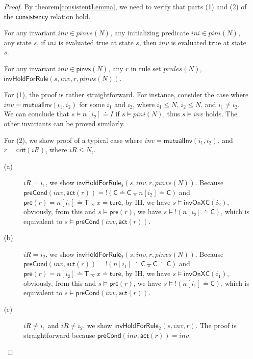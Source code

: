 \documentclass[final]{IEEEtran}
\def \eqc {\doteq }
\def \andc {\barwedge }
\def \negc {!}
\begin{document}
\begin{proof} By theorem\ref{consistentLemma}, we need
to verify that parts (1) and (2) of
 the $\mathsf{consistency}$ relation  hold.

\begin{description}
\item[(1)]
 For any invariant $inv \in pinvs(N)$, any initializing predicate
$ini \in pini(N)$, any state $s$, if $ini$ is evaluated true at state
$s$, then $inv$ is
evaluated true at state $s$.\\
\item[(2)]
 For any invariant $inv \in \mathsf{pinvs}(N)$, any $r$ in rule set
$prules(N)$,  $\mathsf{invHoldForRule}(s,inv,r,pinvs(N))$.\\
\end{description}
For (1), the proof is rather straightforward.    For instance,
consider the case where $inv= \mathsf{mutualInv}( i_1, i_2)$ for some $i_1$ and $i_2$, where
 $i_1\le N$, $i_2\le N$, and $i_1\neq i_2$. We can
 conclude that $s\models  n[i_2]\eqc I$ if $s\models pini(N)$,
thus $s\models inv$ holds. The other invariants can be
proved similarly.

\noindent For (2), we show  proof of a typical case where
$inv=\mathsf{mutualInv} (i_1, i_2)$, and $r=\mathsf{crit }(iR)$, where $iR\le N$,. %
 \begin{description}
 \item[(a)]
  $iR=i_1$, we  show   $\mathsf{invHoldForRule_3}(s, inv, r,
pinvs(N))$. Because $\mathsf{preCond}(inv,\mathsf{act}(r))=\negc( \mathsf{C}\eqc\mathsf{C}\andc n[i_2]\eqc\mathsf{C})$ and $\mathsf{pre}(r)=n[i_1]\eqc \mathsf{T} \andc x\eqc \mathsf{ture}$, by IH, we have
$s \models \mathsf{invOnXC} (i_2)$, obviously, from this and  $s \models \mathsf{pre}(r)$, we have $s \models \negc(  n[i_2]\eqc\mathsf{C})$, which is equivalent to $s \models \mathsf{preCond}(inv,\mathsf{act}(r))$.

 \item[(b)] $iR=i_2$, we  show $\mathsf{invHoldForRule_3}(s, inv, r,pinvs(N))$.   Because $\mathsf{preCond}(inv,\mathsf{act}(r))=\negc (n[i_1]\eqc\mathsf{C} \andc \mathsf{C}\eqc\mathsf{C} )$ and $\mathsf{pre}(r)=n[i_2]\eqc \mathsf{T} \andc x\eqc \mathsf{ture}$,  by IH, we have
$s \models \mathsf{invOnXC} (i_1)$, obviously, from  this and  $s\models \mathsf{pre}(r)$, we have $s \models \negc(  n[i_1]\eqc\mathsf{C})$, which is equivalent to $s\models \mathsf{preCond}(inv,\mathsf{act}(r))$.


 \item[(c)] $iR\neq i_1$ and $iR\neq i_2$, we  show
$\mathsf{invHoldForRule_2}(s, inv, r)$. The proof is straightforward because $\mathsf{preCond}(inv,\mathsf{act}(r))=inv$.
\end{description}
 \end{proof}
\end{document}
